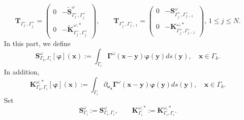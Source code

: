 \documentclass[10pt,reqno,oneside]{amsart}%
\theoremstyle{definition}
\theoremstyle{remark}
\numberwithin{equation}{section}
\numberwithin{equation}{section}
\begin{document}
\begin{equation}
\mathbf{T}_{{\Gamma_{j}^-},{\Gamma_{j}^+}}=
\begin{pmatrix}
0& -\tilde{\mathbf{S}}_{\Gamma_{j}^-,\Gamma_{j}^+}^{\omega}  \\
0& -\tilde{\mathbf{K}}_{\Gamma_{j}^-,\Gamma_{j}^+}^{\omega,*}
\end{pmatrix},\quad \quad
\mathbf{T}_{{\Gamma_{j}^+},{\Gamma_{j-1}^-}}=
\begin{pmatrix}
0& -{\mathbf{S}}_{\Gamma_{j}^+,\Gamma_{j-1}^-}^{\omega}  \\
0& -{\mathbf{K}}_{\Gamma_{j}^+,\Gamma_{j-1}^-}^{\omega,*}
\end{pmatrix},\,1\leq j\leq N.\nonumber
\end{equation}
In this part, we define
\begin{equation}
\mathbf{S}_{\Gamma_{k},\Gamma_{i}}^{\omega}[\boldsymbol{\varphi}](\mathbf{x}):=\int_{\Gamma_{i}}\boldsymbol{\Gamma}^{\omega}(\mathbf{x}-\mathbf{y}) \boldsymbol{\varphi}(\mathbf{y}) d s(\mathbf{y}), \quad \mathbf{x} \in \Gamma_{k}.\nonumber
\end{equation}
In addition,
\begin{equation}
\mathbf{K}_{\Gamma_{k},\Gamma_{i}}^{\omega,*}[\boldsymbol{\varphi}](\mathbf{x}):=\int_{\Gamma_{i}} \partial_{\boldsymbol{\nu}_{\mathbf{x}}} \boldsymbol{\Gamma}^{\omega}(\mathbf{x}-\mathbf{y}) \boldsymbol{\varphi}(\mathbf{y}) d s(\mathbf{y}),\quad \mathbf{x} \in \Gamma_{k}.\nonumber
\end{equation}
Set
\begin{equation}\label{single layer potential}
\mathbf{S}_{\Gamma_{i}}^{\omega}:=\mathbf{S}_{\Gamma_{i},\Gamma_{i}}^{\omega},\quad \quad \mathbf{K}_{\Gamma_{i}}^{\omega,*}:=\mathbf{K}_{\Gamma_{i},\Gamma_{i}}^{\omega,*}.\nonumber
\end{equation}
\end{document}
